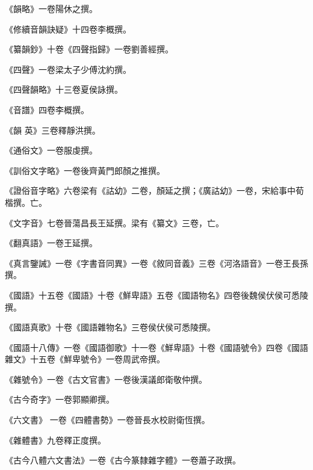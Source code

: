\begin{pinyinscope}
 《韻略》一卷陽休之撰。



 《修續音韻訣疑》十四卷李概撰。



 《纂韻鈔》十卷《四聲指歸》一卷劉善經撰。



 《四聲》一卷梁太子少傅沈約撰。



 《四聲韻略》十三卷夏侯詠撰。



 《音譜》四卷李概撰。



 《韻
 英》三卷釋靜洪撰。



 《通俗文》一卷服虔撰。



 《訓俗文字略》一卷後齊黃門郎顏之推撰。



 《證俗音字略》六卷梁有《詁幼》二卷，顏延之撰；《廣詁幼》一卷，宋給事中荀楷撰。亡。



 《文字音》七卷晉蕩昌長王延撰。梁有《纂文》三卷，亡。



 《翻真語》一卷王延撰。



 《真言鑒誡》一卷《字書音同異》一卷《敘同音義》三卷《河洛語音》一卷王長孫撰。



 《國語》十五卷《國語》十卷《鮮卑語》五卷《國語物名》四卷後魏侯伏侯可悉陵撰。



 《國語真歌》十卷《國語雜物名》三卷侯伏侯可悉陵撰。



 《國語十八傳》一卷《國語御歌》十一卷《鮮卑語》十卷《國語號令》四卷《國語雜文》十五卷《鮮卑號令》一卷周武帝撰。



 《雜號令》一卷《古文官書》一卷後漢議郎衛敬仲撰。



 《古今奇字》一卷郭顯卿撰。



 《六文書》
 一卷《四體書勢》一卷晉長水校尉衛恆撰。



 《雜體書》九卷釋正度撰。



 《古今八體六文書法》一卷《古今篆隸雜字體》一卷蕭子政撰。




\end{pinyinscope}
